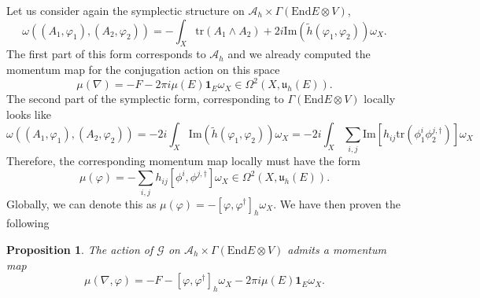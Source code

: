 \documentclass[12pt,a4paper]{book}
\newtheorem{prop}[thm]{Proposition}
\theoremstyle{definition} \newtheorem{defn}[thm]{Definition}
\theoremstyle{definition} \newtheorem{ejemplo}[thm]{Example}
\theoremstyle{remark} \newtheorem{rem}[thm]{Remark}
\def\AA{\mathscr{A}}
\def\GG{\mathscr{G}}
\def\tr{\mathrm{tr}}
\def\id{\mathbf{1}}
\def\End{\mathrm{End}}
\def\uu{\mathfrak{u}}
\begin{document}
    Let us consider again the symplectic structure on $\AA_h\times \Gamma(\End E \otimes V)$,
    \begin{equation*}
      \omega\left( (A_1,\varphi_1),(A_2,\varphi_2) \right)=-\int_X \tr(A_1 \wedge A_2) + 2i \mathrm{Im}(\tilde{h}(\varphi_1, \varphi_2)) \omega_X.
    \end{equation*}
    The first part of this form corresponds to $\AA_h$ and we already computed the momentum map for the conjugation action on this space
    \begin{equation*}
      \mu(\nabla)=-F-2\pi i \mu(E)\id_E \omega_X \in \Omega^2(X,\uu_h(E)).
    \end{equation*}
    The second part of the symplectic form, corresponding to $\Gamma(\End E \otimes V)$ locally looks like
    \begin{equation*}
      \omega\left( (A_1,\varphi_1),(A_2,\varphi_2) \right)=- 2i\int_X  \mathrm{Im}(\tilde{h}(\varphi_1, \varphi_2)) \omega_X=-2i\int_X \sum_{i,j}\mathrm{Im}[h_{ij} \tr(\phi_1^i\phi_2^{j,\dagger})] \omega_X
    \end{equation*}
    Therefore, the corresponding momentum map locally must have the form
    \begin{equation*}
      \mu(\varphi)=-\sum_{i,j} h_{ij}[\phi^i,\phi^{j,\dagger}]\omega_X \in \Omega^2(X,\uu_h(E)).
    \end{equation*}
    Globally, we can denote this as $\mu(\varphi)=-[\varphi,\varphi^{\dagger}]_h\omega_X$. We have then proven the following
    \begin{prop}
     The action of $\GG$ on $\AA_h \times \Gamma(\End E \otimes V)$ admits a momentum map
     \begin{equation*}
       \mu(\nabla,\varphi)=-F-\left[ \varphi,\varphi^\dagger \right]_h \omega_X -2\pi i \mu(E) \id_E \omega_X.
     \end{equation*}
    \end{prop}
\end{document}
